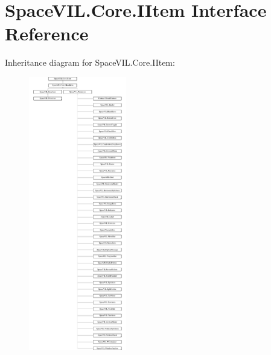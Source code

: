 \hypertarget{interface_space_v_i_l_1_1_core_1_1_i_item}{}\section{Space\+V\+I\+L.\+Core.\+I\+Item Interface Reference}
\label{interface_space_v_i_l_1_1_core_1_1_i_item}
Inheritance diagram for Space\+V\+I\+L.\+Core.\+I\+Item\+:\begin{figure}[H]
\begin{center}
\leavevmode
\includegraphics[height=12.000000cm]{interface_space_v_i_l_1_1_core_1_1_i_item}
\end{center}
\end{figure}
